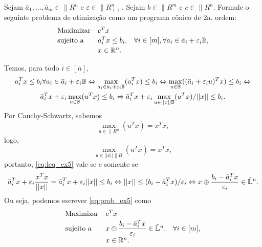 \begin{homeworkProblem}
Sejam $\bar{a}_1, \dots, \bar{a}_m \in \|{R}^n$ e $\varepsilon \in \|{R}_{++}^n$. Sejam $b \in \|{R}^m$ e $c \in \|{R}^n$. Formule o seguinte problema de otimização como um programa cônico de 2a. ordem:
\begin{equation} \label{eq:prob_ex5}
    \begin{array}[!h]{lll}
        \text{Maximizar} & c^Tx                     & \\[2pt]
        \text{sujeito a} & a_i^Tx \leq b_i,         & \forall i \in [m], \forall a_i \in \bar{a}_i + \varepsilon_i \|{B}, \\[2pt]
                         & x \in \|{R}^n.           & \\
    \end{array}
\end{equation}
\end{homeworkProblem}

\begin{homeworkProblemAnswer}
Temos, para todo $i \in [n]$, 
\begin{multline} \label{eq:leq_ex5}
    a_i^Tx \leq b_i \forall a_i \in \bar{a}_i + \varepsilon_i \mathbb{B} \Leftrightarrow 
    \max \limits_{a_i \in \bar{a}_i + \varepsilon_i\mathbb{B}}(a_i^Tx) \leq b_i \Leftrightarrow
    \max \limits_{u \in \mathbb{B}}((\bar{a}_i + \varepsilon_iu)^Tx) \leq b_i \Leftrightarrow \\
    \bar{a}_i^Tx + \varepsilon_i \max \limits_{u \in \mathbb{B}}(u^Tx) \leq b_i \Leftrightarrow
    \bar{a}_i^Tx + \varepsilon_i \max \limits_{u \in ||x||\mathbb{B}}(u^Tx)/||x|| \leq b_i.
\end{multline}
Por Cauchy-Schwartz, sabemos
$$ \max \limits_{u \in \|{R}^n}(u^Tx) = x^Tx, $$
logo,
$$ \max \limits_{u \in ||x||\|{B}}(u^Tx) = x^Tx,$$
portanto, \eqref{eq:leq_ex5} vale se e somente se
$$ 
    \bar{a}_i^Tx + \varepsilon_i \dfrac{x^Tx}{||x||} = \bar{a}_i^Tx + \varepsilon_i||x|| \leq b_i \Leftrightarrow
    ||x|| \leq (b_i - \bar{a}_i^Tx)/\varepsilon_i \Leftrightarrow
    x \oplus \dfrac{b_i - \bar{a}_i^Tx}{\varepsilon_i} \in \hat{\mathbb{L}}^n.
$$
Ou seja, podemos escrever \eqref{eq:prob_ex5} como 
\begin{equation*}
    \begin{array}[!h]{lll}
        \text{Maximizar} & c^Tx                                                                      & \\[2pt]
        \text{sujeito a} & x \oplus \dfrac{b_i - \bar{a}_i^Tx}{\varepsilon_i} \in \hat{\|{L}}^n,     & \forall i \in [m], \\[2pt]
                         & x \in \|{R}^n.                                                              & \\
    \end{array}
\end{equation*}
\end{homeworkProblemAnswer}


